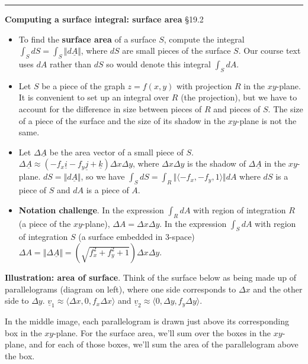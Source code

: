 \documentclass[12pt,letterpaper,noanswers]{exam}
\newcommand{\mb}[1]{\underline{#1}}
\begin{document}
\eject
\vspace{0.2cm}
\hrule
\vspace{0.2cm}

\noindent\textbf{Computing a surface integral: surface area} \S 19.2
\begin{tcolorbox}
\begin{itemize}
\itemsep0em
    \item To find the \textbf{surface area} of a surface $S$, compute the integral $\int_S dS = \int_S \Vert d\mb A\Vert$, where $dS$ are small pieces of the surface $S$.  Our course text uses $dA$ rather than $dS$ so would denote this integral $\int_S dA$.
    \item Let $S$ be a piece of the graph $z = f(x,y)$ with projection $R$ in the $xy$-plane.  It is convenient to set up an integral over $R$ (the projection), but we have to account for the difference in size between pieces of $R$ and pieces of $S$.  The size of a piece of the surface and the size of its shadow in the $xy$-plane is not the same.
    \item Let $\Delta \mb A$ be the area vector of a small piece of $S$.  $\displaystyle \Delta \mb A \approx (-f_x\mb i - f_y\mb j + \mb k)\Delta x\Delta y$, where $\Delta x\Delta y$ is the shadow of $\Delta \mb A$ in the $xy$-plane.  $dS = \Vert d\mb A\Vert$, so we have $\displaystyle\int_S dS = \int_R \Vert \langle -f_x, -f_y, 1\rangle \Vert dA$ where $dS$ is a piece of $S$ and $dA$ is a piece of $A$.
    \item \textbf{Notation challenge}.  In the expression $\int_R dA$ with region of integration $R$ (a piece of the $xy$-plane), $\Delta A = \Delta x\Delta y$.  In the expression $\int_S dA$ with region of integration $S$ (a surface embedded in $3$-space) $\displaystyle \Delta A = \Vert \Delta \mb A\Vert = \left(\sqrt{f_x^2+f_y^2+1}\right)\Delta x\Delta y$.   
\end{itemize}


\end{tcolorbox}

\noindent\textbf{Illustration: area of surface}.  Think of the surface below as being made up of parallelograms (diagram on left), where one side corresponds to $\Delta x$ and the other side to $\Delta y$.  $\mb v_1 \approx \langle \Delta x, 0, f_x \Delta x \rangle$ and $\mb v_2 \approx \langle  0,\Delta y, f_y\Delta y\rangle$.

In the middle image, each parallelogram is drawn just above its corresponding box in the $xy$-plane.  For the surface area, we'll sum over the boxes in the $xy$-plane, and for each of those boxes, we'll sum the area of the parallelogram above the box.  
\end{document}
